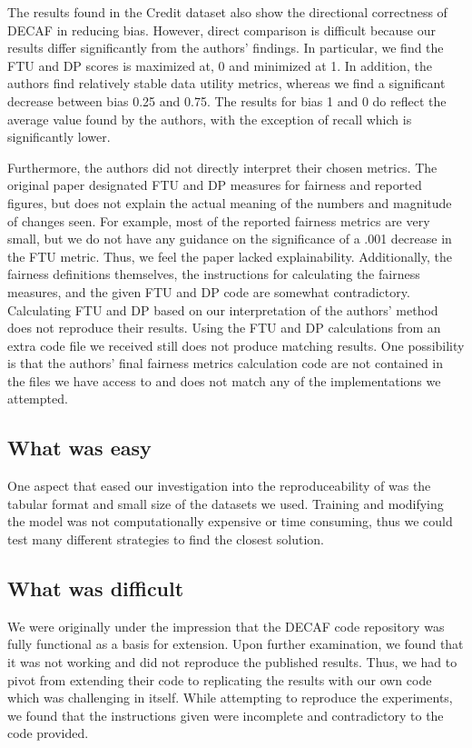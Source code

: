 The results found in the Credit dataset also show the directional correctness of DECAF in reducing bias. However, direct comparison is difficult because our results differ significantly from the authors' findings. In particular, we find the FTU and DP scores is maximized at, 0 and minimized at 1. In addition, the authors find relatively stable data utility metrics, whereas we find a significant decrease between bias 0.25 and 0.75. The results for bias 1 and 0 do reflect the average value found by the authors, with the exception of recall which is significantly lower.

Furthermore, the authors did not directly interpret their chosen metrics. The original paper designated FTU and DP measures for fairness and reported figures, but does not explain the actual meaning of the numbers and magnitude of changes seen. For example, most of the reported fairness metrics are very small, but we do not have any guidance on the significance of a .001 decrease in the FTU metric. Thus, we feel the paper lacked explainability. Additionally, the fairness definitions themselves, the instructions for calculating the fairness measures, and the given FTU and DP code are somewhat contradictory. Calculating FTU and DP based on our interpretation of the authors' method does not reproduce their results. Using the FTU and DP calculations from an extra code file we received still does not produce matching results. One possibility is that the authors' final fairness metrics calculation code are not contained in the files we have access to and does not match any of the implementations we attempted. 

\subsection{What was easy}
One aspect that eased our investigation into the reproduceability of \citep{DBLP:conf/nips/BreugelKBS21} was the tabular format and small size of the datasets we used. Training and modifying the model was not computationally expensive or time consuming, thus we could test many different strategies to find the closest solution. 

\subsection{What was difficult}

We were originally under the impression that the DECAF code repository was fully functional as a basis for extension. Upon further examination, we found that it was not working and did not reproduce the published results. Thus, we had to pivot from extending their code to replicating the results with our own code which was challenging in itself. While attempting to reproduce the experiments, we found that the instructions given were incomplete and contradictory to the code provided.

